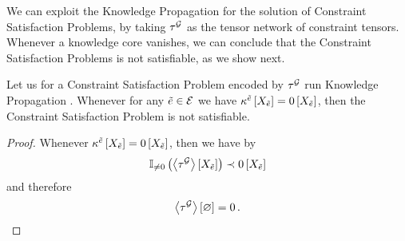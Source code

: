 We can exploit the Knowledge Propagation  for the solution of Constraint Satisfaction Problems, by taking $\tau^{\mathcal{G}}$ as the tensor network of constraint tensors.
Whenever a knowledge core vanishes, we can conclude that the Constraint Satisfaction Problems is not satisfiable, as we show next.

\begin{corollary}
    Let us for a Constraint Satisfaction Problem encoded by $\tau^{\mathcal{G}}$ run Knowledge Propagation .
    Whenever for any $\tilde{e}\in\mathcal{E}$ we have $\kappa^{\tilde{e}}\left[X_{\tilde{e}}\right]=0\left[X_{\tilde{e}}\right]$, then the Constraint Satisfaction Problem is not satisfiable.
\end{corollary}
\begin{proof}
    Whenever $\kappa^{\tilde{e}}\left[X_{\tilde{e}}\right]=0\left[X_{\tilde{e}}\right]$, then we have by 
    \begin{align*}
        \mathbb{I}_{\neq0}\left(\left\langle \tau^{\mathcal{G}}\right\rangle \left[ X_{\tilde{e}} \right]\right) \prec 0\left[X_{\tilde{e}}\right]
    \end{align*}
    and therefore
    \begin{align*}
        \left\langle \tau^{\mathcal{G}}\right\rangle \left[ \varnothing \right] = 0 \, .
    \end{align*}
\end{proof}

